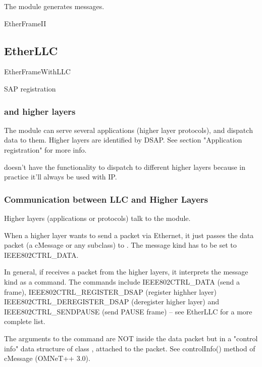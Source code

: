The  module generates  messages.

EtherFrameII

\subsection{EtherLLC}

EtherFrameWithLLC

SAP registration


\subsubsection{ and higher layers}

The  module can serve several applications (higher layer protocols),
and dispatch data to them. Higher layers are identified by DSAP.
See section "Application registration" for more info.

 doesn't have the functionality to dispatch to different
higher layers because in practice it'll always be used with IP.

\subsubsection{Communication between LLC and Higher Layers}

Higher layers (applications or protocols) talk to the  module.

When a higher layer wants to send a packet via Ethernet, it just
passes the data packet (a cMessage or any subclass) to .
The message kind has to be set to IEEE802CTRL\_DATA.

In general, if  receives a packet from the higher layers,
it interprets the message kind as a command. The commands include
IEEE802CTRL\_DATA (send a frame), IEEE802CTRL\_REGISTER\_DSAP (register highher layer)
IEEE802CTRL\_DEREGISTER\_DSAP (deregister higher layer) and IEEE802CTRL\_SENDPAUSE
(send PAUSE frame) -- see EtherLLC for a more complete list.

The arguments to the command are NOT inside the data packet but
in a "control info" data structure of class , attached to
the packet. See controlInfo() method of cMessage (OMNeT++ 3.0).

